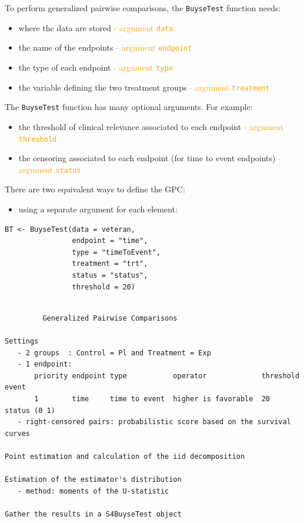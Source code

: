 \documentclass[12pt]{article}
\begin{document}
To perform generalized pairwise comparisons, the \texttt{BuyseTest} function needs:
\begin{itemize}
\item where the data are stored \hfill \textcolor{orange}{- argument \texttt{data}}
\item the name of the endpoints \hfill \textcolor{orange}{- argument \texttt{endpoint}}
\item the type of each endpoint \hfill \textcolor{orange}{- argument \texttt{type}}
\item the variable defining the two treatment groups \hfill
\textcolor{orange}{- argument \texttt{treatment}}
\end{itemize}
The \texttt{BuyseTest} function has many optional arguments. For example:
\begin{itemize}
\item the threshold of clinical relevance associated to each endpoint \hfill \textcolor{orange}{- argument \texttt{threshold}}
\item the censoring associated to each endpoint (for time to event endpoints) \hfill \textcolor{orange}{- argument \texttt{status}}
\end{itemize}

\bigskip

There are two equivalent ways to define the GPC: 
\begin{itemize}
\item using a separate argument for each element:
\end{itemize}

\lstset{language=r,label= ,caption= ,captionpos=b,numbers=none}
\begin{lstlisting}
BT <- BuyseTest(data = veteran, 
                endpoint = "time", 
                type = "timeToEvent", 
                treatment = "trt", 
                status = "status", 
                threshold = 20)
\end{lstlisting}

\begin{verbatim}

         Generalized Pairwise Comparisons

Settings 
   - 2 groups  : Control = Pl and Treatment = Exp
   - 1 endpoint: 
       priority endpoint type           operator             threshold event       
       1        time     time to event  higher is favorable  20        status (0 1)
   - right-censored pairs: probabilistic score based on the survival curves 

Point estimation and calculation of the iid decomposition

Estimation of the estimator's distribution 
   - method: moments of the U-statistic

Gather the results in a S4BuyseTest object
\end{verbatim}
\end{document}
